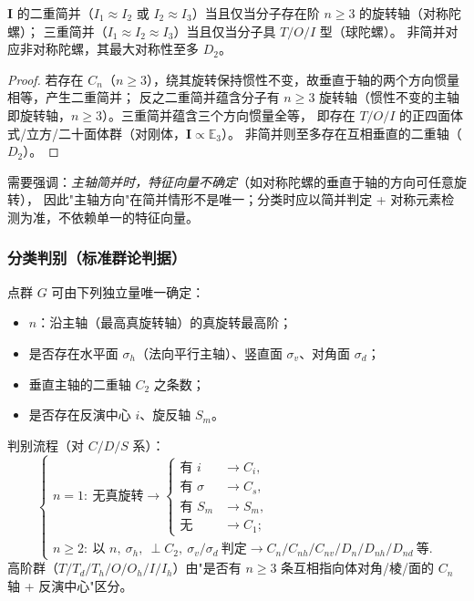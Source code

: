 \begin{lemma}[陀螺分类的主轴依据]\label{lem:gyro}
  $\mathbf I$ 的二重简并（$I_1\approx I_2$ 或 $I_2\approx I_3$）当且仅当分子存在阶 $n\ge3$ 的旋转轴（对称陀螺）；
  三重简并（$I_1\approx I_2\approx I_3$）当且仅当分子具 $T/O/I$ 型（球陀螺）。
  非简并对应非对称陀螺，其最大对称性至多 $D_2$。
\end{lemma}
\begin{proof}
  若存在 $C_n$（$n\ge3$），绕其旋转保持惯性不变，故垂直于轴的两个方向惯量相等，产生二重简并；
  反之二重简并蕴含分子有 $n\ge3$ 旋转轴（惯性不变的主轴即旋转轴，$n\ge3$）。三重简并蕴含三个方向惯量全等，
  即存在 $T/O/I$ 的正四面体式/立方/二十面体群（对刚体，$\mathbf I\propto\mathbb{E}_3$）。
  非简并则至多存在互相垂直的二重轴（$D_2$）。\qedhere
\end{proof}

需要强调：\emph{主轴简并时，特征向量不确定}（如对称陀螺的垂直于轴的方向可任意旋转），
因此"主轴方向"在简并情形不是唯一；分类时应以简并判定 + 对称元素检测为准，不依赖单一的特征向量。

\subsubsection{分类判别（标准群论判据）}
点群 $G$ 可由下列独立量唯一确定：
\begin{itemize}
  \item $n$：沿主轴（最高真旋转轴）的真旋转最高阶；
  \item 是否存在水平面 $\sigma_h$（法向平行主轴）、竖直面 $\sigma_v$、对角面 $\sigma_d$；
  \item 垂直主轴的二重轴 $C_2$ 之条数；
  \item 是否存在反演中心 $i$、旋反轴 $S_m$。
\end{itemize}
判别流程（对 $C/D/S$ 系）：
\begin{equation*}
  \begin{cases}
    n=1:\ \text{无真旋转}\to \begin{cases}
      \text{有 } i & \to C_i,\\
      \text{有 }\sigma & \to C_s,\\
      \text{有 }S_m & \to S_m,\\
      \text{无} & \to C_1;
    \end{cases}\\[6pt]
    n\ge2:\ \text{以 } n,\ \sigma_h,\ \perp C_2,\ \sigma_v/\sigma_d\ \text{判定}\to
    C_n/C_{nh}/C_{nv}/D_n/D_{nh}/D_{nd}\ \text{等}.
  \end{cases}
\end{equation*}
高阶群（$T/T_d/T_h/O/O_h/I/I_h$）由"是否有 $n\ge3$ 条互相指向体对角/棱/面的 $C_n$ 轴 + 反演中心"区分。

